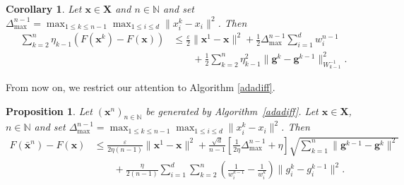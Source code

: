 \documentclass[11pt]{article}
\theoremstyle{plain}
\newtheorem{proposition}[theorem]{Proposition}
\newtheorem{corollary}[theorem]{Corollary}
\theoremstyle{definition}
\theoremstyle{remark}
\newcommand{\norm}[1]{\lVert{#1}\rVert}
\newcommand{\HH}{X}
\newcommand{\bHH}{\bm{X}}
\newcommand{\x}{x}
\newcommand{\m}{d}
\newcommand{\bx}{\bm{x}}
\newcommand{\buu}{\bm{g}}
\newcommand{\uu}{g}
\newcommand{\w}{w}
\newcommand{\iter}{n}
\newcommand{\ite}{k}
\newcommand{\N}{\mathbb{N}}
\newcommand{\W}{W}
\begin{document}
\begin{corollary}
\label{Proposition1}
Let $\bx\in \bHH$ and $\iter \in \N$ and set
$\Delta^{\iter-1}_{\max} = \max_{1\leq \ite\leq \iter-1} \max_{1\leq i\leq \m} \norm{\x^\ite_i - x_i}^2$. Then
\begin{align}\label{Proposition1_bound}
    \nonumber\sum_{\ite=2}^\iter\eta_{\ite-1}(F(\bx^\ite) - F(\bx)) &\le \frac{\varepsilon}{2}\lVert \bx^1 - \bx\rVert^2 + \frac{1}{2}\Delta_{\max}^{\iter-1} \sum_{i=1}^\m \w_i^{\iter-1} \\
     &\qquad  + \frac{1}{2}\sum_{\ite=2}^\iter\eta_{\ite-1}^2 \lVert \buu^{\ite} - \buu^{\ite-1} \rVert_{\W_{\ite-1}^{-1}}^2. 
    \end{align}
\end{corollary}
\noindent
From now on, we restrict our attention to Algorithm \ref{adadiff}.
\begin{proposition}\label{main_theorem}
Let $(\bx^\iter)_{\iter\in \N}$ be generated by Algorithm~\ref{adadiff}.
Let $\bx\in \bHH$, $\iter \in \N$ and set
$\Delta^{\iter-1}_{\max} = \max_{1\leq \ite\leq \iter-1} \max_{1\leq i\leq \m} \norm{\x^\ite_i - x_i}^2$. 
Then
\begin{align}
\nonumber F(\bar{\bx}^{\iter}) - F(\bx)  &\le \frac{\varepsilon}{2\eta(\iter-1)}\lVert \bx^1 - \bx\rVert^2 +\frac{\sqrt{\m}}{\iter-1}\left[\frac{1}{2\eta}\Delta^{\iter-1}_{\max} + \eta \right]
\sqrt{\sum_{\ite=1}^\iter \norm{\buu^{\ite-1}- \buu^\ite}^2}\\
& \qquad + \frac{\eta}{2(\iter-1)} \sum_{i=1}^\m\sum_{\ite=2}^{\iter} \left(\frac{1}{\w_i^{\ite-1}} - \frac{1}{\w_i^\ite}\right)\norm{\uu_i^\ite - \uu_i^{\ite-1}}^2. \label{extra}
\end{align}
\end{proposition}
\end{document}
